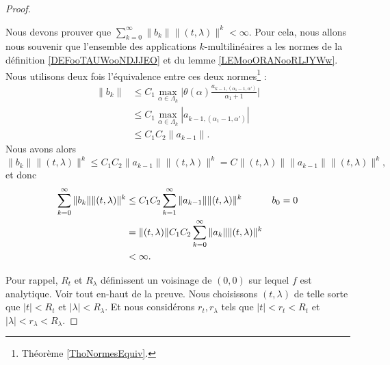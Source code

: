 \begin{proof}
\begin{subproof}

		Nous devons prouver que \( \sum_{k=0}^{\infty}\| b_k \|\| (t,\lambda) \|^k<\infty\). Pour cela, nous allons nous souvenir que l'ensemble des applications \( k\)-multilinéaires a les normes de la définition \ref{DEFooTAUWooNDJJEO} et du lemme \ref{LEMooORANooRLJYWw}. Nous utilisons deux fois l'équivalence entre ces deux normes\footnote{Théorème \ref{ThoNormesEquiv}.} :
		\begin{subequations}
			\begin{align}
				\| b_k \| & \leq C_1\max_{\alpha\in\Lambda_k}\Big| \theta(\alpha)\frac{ a_{k-1,(\alpha_1-1,\alpha')} }{ \alpha_1+1 }  \Big| \\
				          & \leq C_1\max_{\alpha\in\Lambda_k}|  a_{k-1,(\alpha_1-1,\alpha') }|                                              \\
				          & \leq C_1C_2\| a_{k-1} \|.
			\end{align}
		\end{subequations}
		Nous avons alors
		\begin{equation}
			\| b_k \|\| (t,\lambda) \|^k  \leq C_1C_2\| a_{k-1} \|\| (t,\lambda) \|^k =C\| (t,\lambda) \|\| a_{k-1} \|\| (t,\lambda) \|^k,
		\end{equation}
		et donc
		\begin{subequations}
			\begin{align}
				\sum_{k=0}^{\infty}\| b_k \|\| (t,\lambda) \|^k & \leq C_1C_2\sum_{k=1}^{\infty}\| a_{k-1} \|\| (t,\lambda) \|^k          & \text{\( b_0=0\)} \\
				                                                & =\| (t,\lambda) \|C_1C_2\sum_{k=0}^{\infty}\| a_k \|\| (t,\lambda) \|^k                     \\
				                                                & <\infty.
			\end{align}
		\end{subequations}
	\end{subproof}

	Pour rappel, \( R_t\) et \( R_{\lambda}\) définissent un voisinage de \( (0,0)\) sur lequel \( f\) est analytique. Voir tout en-haut de la preuve. Nous choisissons \( (t,\lambda)\) de telle sorte que \( | t |<R_t\) et \( | \lambda |<R_{\lambda}\). Et nous considérons \( r_t,r_{\lambda}\) tels que \( | t |<r_t<R_t\) et \( | \lambda |<r_{\lambda}<R_{\lambda}\).


\end{proof}
